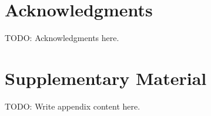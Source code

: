 \documentclass{article}
\theoremstyle{definition}
\theoremstyle{remark}
\begin{document}
\section*{Acknowledgments}
TODO: Acknowledgments here.




\newpage
\appendix
\section{Supplementary Material}
\label{app:supplement}

TODO: Write appendix content here.
\end{document}
